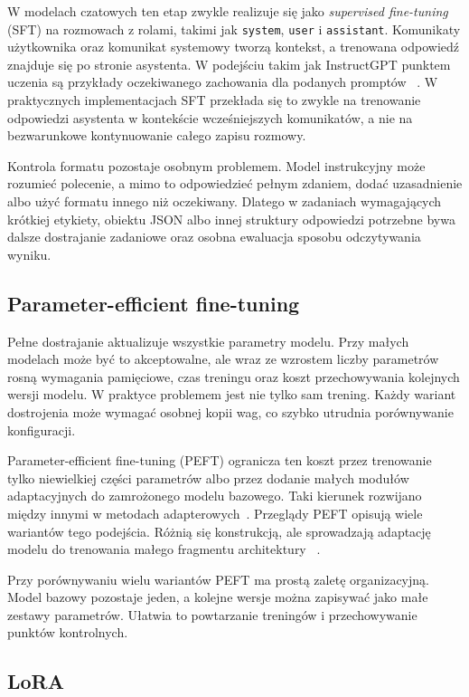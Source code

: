 W modelach czatowych ten etap zwykle realizuje się jako \emph{supervised
fine-tuning} (SFT) na rozmowach z rolami, takimi jak \texttt{system},
\texttt{user} i \texttt{assistant}. Komunikaty użytkownika oraz komunikat
systemowy tworzą kontekst, a trenowana odpowiedź znajduje się po stronie
asystenta. W podejściu takim jak InstructGPT punktem uczenia są przykłady
oczekiwanego zachowania dla podanych promptów
~\autocite{ouyang-instruction-following}. W praktycznych implementacjach SFT
przekłada się to zwykle na trenowanie odpowiedzi asystenta w kontekście
wcześniejszych komunikatów, a nie na bezwarunkowe kontynuowanie całego zapisu
rozmowy.

Kontrola formatu pozostaje osobnym problemem. Model instrukcyjny może rozumieć
polecenie, a mimo to odpowiedzieć pełnym zdaniem, dodać uzasadnienie albo użyć
formatu innego niż oczekiwany. Dlatego w zadaniach wymagających krótkiej
etykiety, obiektu JSON albo innej struktury odpowiedzi potrzebne bywa dalsze
dostrajanie zadaniowe oraz osobna ewaluacja sposobu odczytywania wyniku.

\subsection{Parameter-efficient fine-tuning}

Pełne dostrajanie aktualizuje wszystkie parametry modelu. Przy małych modelach
może być to akceptowalne, ale wraz ze wzrostem liczby parametrów rosną wymagania
pamięciowe, czas treningu oraz koszt przechowywania kolejnych wersji modelu. W
praktyce problemem jest nie tylko sam trening. Każdy wariant dostrojenia może
wymagać osobnej kopii wag, co szybko utrudnia porównywanie konfiguracji.

Parameter-efficient fine-tuning (PEFT) ogranicza ten koszt przez trenowanie tylko
niewielkiej części parametrów albo przez dodanie małych modułów adaptacyjnych do
zamrożonego modelu bazowego. Taki kierunek rozwijano między innymi w metodach
adapterowych~\autocite{houlsby-parameter-efficient-transfer}. Przeglądy PEFT
opisują wiele wariantów tego podejścia. Różnią się konstrukcją, ale sprowadzają
adaptację modelu do trenowania małego fragmentu architektury
~\autocite{lialin-peft-guide}.

Przy porównywaniu wielu wariantów PEFT ma prostą zaletę organizacyjną. Model
bazowy pozostaje jeden, a kolejne wersje można zapisywać jako małe zestawy
parametrów. Ułatwia to powtarzanie treningów i przechowywanie punktów
kontrolnych.

\subsection{LoRA}

